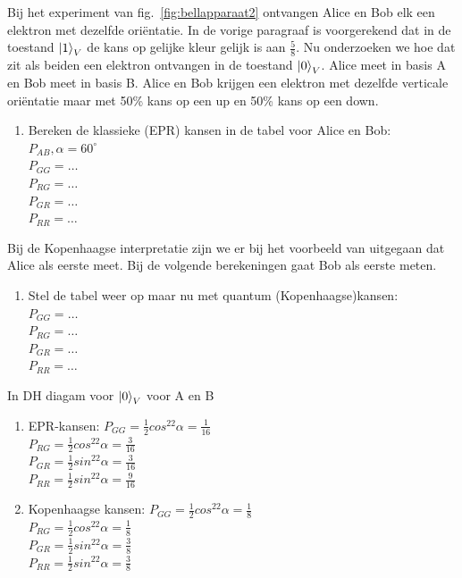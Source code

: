 \documentclass[../../main.tex]{subfiles}
\begin{document}
\begin{opdrachtlang}\label{opd:bell}
Bij het experiment van fig.~\ref{fig:bellapparaat2} ontvangen Alice en Bob elk een elektron met dezelfde oriëntatie. In de vorige paragraaf is voorgerekend dat in de toestand $\ket{1}_V$ de kans op gelijke kleur gelijk is aan $\tfrac{5}{8}$. Nu onderzoeken we hoe dat zit als beiden een elektron ontvangen in de toestand $\ket{0}_V$. Alice meet in basis A en Bob meet in basis B.
Alice en Bob krijgen een elektron met dezelfde verticale oriëntatie maar met 50\% kans op een up en 50\% kans op een down.

\begin{enumerate}[nosep]
\item Bereken de klassieke (EPR) kansen in de tabel voor Alice en Bob:$P_{AB}, \alpha=60^{\circ}$\\
$P_{GG}= \dots$\\ 
$P_{RG}= \dots$\\ 
$P_{GR}= \dots$\\
$P_{RR}= \dots$\\
\end{enumerate}

Bij de Kopenhaagse interpretatie zijn we er bij het voorbeeld van uitgegaan dat Alice als eerste meet. Bij de volgende berekeningen gaat Bob als eerste meten.
\begin{enumerate}[resume]
\item	Stel de tabel weer op maar nu met quantum (Kopenhaagse)kansen:\\
$P_{GG}= \dots$\\ 
$P_{RG}= \dots$\\ 
$P_{GR}= \dots$\\
$P_{RR}= \dots$\\
\end{enumerate}

\end{opdrachtlang}
\begin{antwoord}[-6cm]
In DH diagam voor $\ket{0}_V$ voor A en B
\begin{enumerate}[wide, labelwidth=!, labelindent=0pt]
\item  EPR-kansen:
$P_{GG}=\tfrac{1}{2}cos^22\alpha = \tfrac{1}{16}$\\ 
$P_{RG}=\tfrac{1}{2}cos^22\alpha = \tfrac{3}{16}$\\ 
$P_{GR}=\tfrac{1}{2}sin^22\alpha = \tfrac{3}{16}$\\ 
$P_{RR}=\tfrac{1}{2}sin^22\alpha = \tfrac{9}{16}$\\ 
\item Kopenhaagse kansen:
$P_{GG}=\tfrac{1}{2}cos^22\alpha = \tfrac{1}{8}$\\ 
$P_{RG}=\tfrac{1}{2}cos^22\alpha = \tfrac{1}{8}$\\ 
$P_{GR}=\tfrac{1}{2}sin^22\alpha = \tfrac{3}{8}$\\ 
$P_{RR}=\tfrac{1}{2}sin^22\alpha = \tfrac{3}{8}$\\ 
\end{enumerate}
\end{antwoord}
\end{document}
